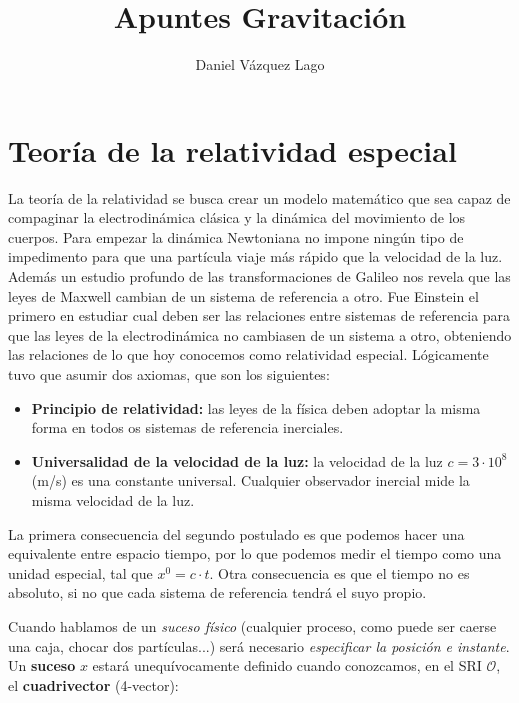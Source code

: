 \documentclass[12pt,a4paper]{book}
\title{Apuntes Gravitación}
\author{Daniel Vázquez Lago}
\numberwithin{equation}{section}
\numberwithin{figure}{section}
\begin{document}
\maketitle

\newpage

\tableofcontents

\newpage


\chapter{Teoría de la relatividad especial}

La teoría de la relatividad se busca crear un modelo matemático que sea capaz de compaginar la electrodinámica clásica y la dinámica del movimiento de los cuerpos. Para empezar la dinámica Newtoniana no impone ningún tipo de impedimento para que una partícula viaje más rápido que la velocidad de la luz. Además un estudio profundo de las transformaciones de Galileo nos revela que las leyes de Maxwell cambian de un sistema de referencia a otro. Fue Einstein el primero en estudiar cual deben ser las relaciones entre sistemas de referencia para que las leyes de la electrodinámica no cambiasen de un sistema a otro, obteniendo las relaciones de lo que hoy conocemos como relatividad especial. Lógicamente tuvo que asumir dos axiomas, que son los siguientes:

\begin{itemize}
\item \textbf{Principio de relatividad:} las leyes de la física deben adoptar la misma forma en todos os sistemas de referencia inerciales.

\item \textbf{Universalidad de la velocidad de la luz:} la velocidad de la luz $c=3\cdot 10^8$ (m/s) es una constante universal. Cualquier observador inercial mide la misma velocidad de la luz.
\end{itemize}


La primera consecuencia del segundo postulado es que podemos hacer una equivalente entre espacio tiempo, por lo que podemos medir el tiempo como una unidad especial, tal que $x^0=c \cdot t$. Otra consecuencia es que el tiempo no es absoluto, si no que cada sistema de referencia tendrá el suyo propio.


Cuando hablamos de un \textit{suceso físico} (cualquier proceso, como puede ser caerse una caja, chocar dos partículas...) será necesario \textit{especificar la posición e instante}. Un \textbf{suceso} $x$ estará unequívocamente definido cuando conozcamos, en el SRI $\mathcal{O}$, el  \textbf{cuadrivector} (4-vector):
\end{document}
